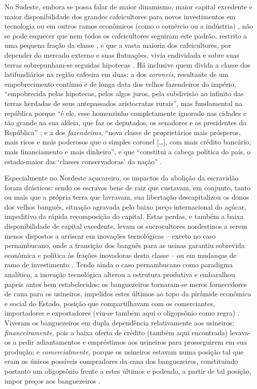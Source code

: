 No Sudeste, embora se possa falar de maior dinamismo, maior capital excedente e maior disponibilidade dos grandes cafeicultores para novos investimentos em tecnologia ou em outros ramos econômicos (como o comércio ou a indústria) \cite[p.~153-154]{CARONE1970inst}, não se pode esquecer que nem todos os cafeicultores seguiram este padrão, restrito a uma pequena fração da classe \cite[p.~32-38]{gorender_burguesia_1990}, e que a vasta maioria dos cafeicultores, por depender do mercado externo e suas flutuações, vivia endividada e sobre suas terras sobrepunham-se seguidas hipotecas \cite[p.~154]{CARONE1970inst}. Há inclusive quem divida a classe dos latifundiários na região cafeeira em duas: a dos \textit{coroneis}, resultante de um empobrecimento contínuo e de longa data dos velhos fazendeiros do império, ``empobrecida pelas hipotecas, pelos algos juros, pela subdivisão ao infinito das terras herdadas de seus antepassados aristocratas rurais'', mas fundamental na república porque ``é ele, esse homenzinho completamente ignorado nas cidades e tão grande na sua aldeia, que faz os deputados, os senadores e os presidentes da República'' \cite[pp.~146-148]{basbaum_histsinc_1967} ; e a dos \textit{fazendeiros}, ``nova classe de proprietários mais prósperos, mais ricos e mais poderosos que o simples coronel [\dots], com mais crédito bancário, mais financiamento e mais dinheiro'', e que ``constitui a cabeça política do país, o estado-maior das `classes conservadoras' da nação'' \cite[p.~149]{basbaum_histsinc_1967}.

Especialmente no Nordeste açucareiro, os impactos da abolição da escravidão foram drásticos: sendo os escravos bens de raiz que custavam, em conjunto, tanto ou mais que a própria terra que lavravam, sua libertação descapitalizou os donos dos velhos banguês, situação agravada pelo baixo preço internacional do açúcar, impeditivo da rápida recomposição do capital. Estas perdas, e também a baixa disponibilidade de capital excedente, levam os sucrocultores nordestinos a serem menos dispostos a arriscar em inovações tecnológicas -- exceto no caso pernambucano, onde a transição dos banguês para as usinas garantiu sobrevida econômica e política às frações inovadoras desta classe -- ou em mudanças de ramo de investimento \cite[p.~153]{CARONE1970inst}.   Tendo ainda o caso pernambucano como paradigma analítico, a inovação tecnológica alterou a estrutura produtiva e embaralhou papeis antes bem estabelecidos: os banguezeiros tornaram-se meros fornecedores de cana para os usineiros, impelidos estes últimos ao topo da pirâmide econômica e social do Estado, posição que compartilhavam com os comerciantes, importadores e exportadores (viu-se também aqui o oligopsônio como regra) \cite[p.~228]{perissinotto_cladom_1994}. Viveram os banguezeiros em dupla dependência relativamente aos usineiros: \textit{financeiramente}, pois a baixa oferta de crédito (também aqui encontrada) levava-os a pedir adiantamentos e empréstimos aos usineiros para prosseguirem em sua produção; e \textit{comercialmente}, porque os usineiros estavam numa posição tal que eram os únicos possíveis compradores da cana dos banguezeiros, constituindo portanto um oligopsônio frente a estes últimos e podendo, a partir de tal posição, impor preços aos banguezeiros \cite[pp.~228-229]{perissinotto_cladom_1994}.

